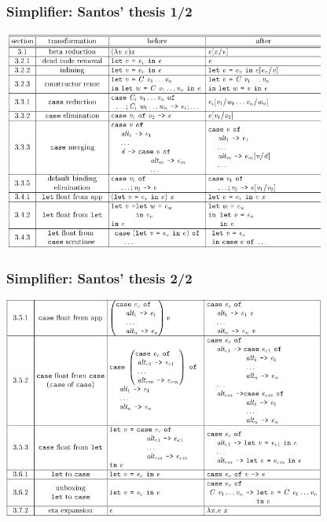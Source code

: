 \documentclass[aspectratio=169]{beamer}
\begin{document}
\begin{frame}
  \frametitle{Simplifier: Santos' thesis 1/2}

  \includegraphics[width=25pc]{images/santos1.png}
\end{frame}

\begin{frame}
  \frametitle{Simplifier: Santos' thesis 2/2}

  \includegraphics[width=25pc]{images/santos2.png}
\end{frame}
\end{document}
